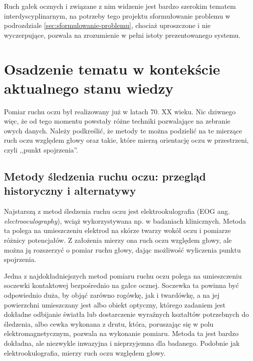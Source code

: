 \documentclass[a4paper,twoside,12pt]{book}
\newcommand{\obcy}[1]{\emph{#1}}
\newcommand{\english}[1]{{\selectlanguage{british}\obcy{#1}}}
\begin{document}
Ruch gałek ocznych i związane z nim widzenie jest bardzo szerokim tematem interdyscyplinarnym, na potrzeby tego projektu sformułowanie problemu w podrozdziale \ref{sec:sformulowanie-problemu}, chociaż uproszczone i nie wyczerpujące, pozwala na zrozumienie w pełni istoty prezentowanego systemu.


\section{Osadzenie tematu w kontekście aktualnego stanu wiedzy}
\label{sec:osadzenie-tematu-w-kontekscie-aktualnego-stanu-wiedzy}

Pomiar ruchu oczu był realizowany już w latach 70. XX wieku. Nic dziwnego więc, że od tego momentu powstały różne techniki pozwalające na zebranie owych danych. Należy podkreślić, że metody te można podzielić na te mierzące ruch oczu względem głowy oraz takie, które mierzą orientację oczu w przestrzeni, czyli ,,punkt spojrzenia''.

\subsection{Metody śledzenia ruchu oczu: przegląd historyczny i alternatywy}
\label{subsec:metody-sledzenia-ruchu-oczu-przeglad-historyczny-i-alternatywy}

Najstarszą z metod śledzenia ruchu oczu jest elektrookulografia (EOG ang. \english{electrooculography}), wciąż wykorzystywana np. w badaniach klinicznych. Metoda ta polega na umieszczeniu elektrod na skórze twarzy wokół oczu i pomiarze różnicy potencjałów. Z założenia mierzy ona ruch oczu względem głowy, ale można ją rozszerzyć o pomiar ruchu głowy, dając możliwość wyliczenia punktu spojrzenia. 

Jedna z najdokładniejszych metod pomiaru ruchu oczu polega na umieszczeniu soczewki kontaktowej bezpośrednio na gałce ocznej. Soczewka ta powinna być odpowiednio duża, by objąć zarówno rogówkę, jak i twardówkę, a na jej powierzchni umieszczany jest albo obiekt optyczny, którego zadaniem jest dokładne odbijanie światła lub dostarczenie wyraźnych kształtów potrzebnych do śledzenia, albo cewka wykonana z drutu, która, poruszając się w polu elektromagnetycznym, pozwala na wykonanie pomiaru. Metoda ta jest bardzo dokładna, ale niezwykle inwazyjna i nieprzyjemna dla badanego. Podobnie jak elektrookulografia, mierzy ruch oczu względem głowy.
\end{document}
